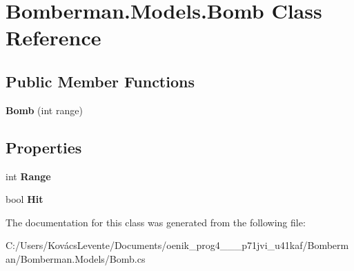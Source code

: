 \hypertarget{class_bomberman_1_1_models_1_1_bomb}{}\section{Bomberman.\+Models.\+Bomb Class Reference}
\label{class_bomberman_1_1_models_1_1_bomb}
\subsection*{Public Member Functions}
\begin{DoxyCompactItemize}
\item 
\mbox{\label{class_bomberman_1_1_models_1_1_bomb_a3503eaa73703689a2f69a60938968127}} 
{\bfseries Bomb} (int range)
\end{DoxyCompactItemize}
\subsection*{Properties}
\begin{DoxyCompactItemize}
\item 
\mbox{\label{class_bomberman_1_1_models_1_1_bomb_ab5c772b9de44d59ab18b485bb75677b7}} 
int {\bfseries Range}
\item 
\mbox{\label{class_bomberman_1_1_models_1_1_bomb_a5dcd6b6185cbbc2f4659a6d228496104}} 
bool {\bfseries Hit}
\end{DoxyCompactItemize}


The documentation for this class was generated from the following file\+:\begin{DoxyCompactItemize}
\item 
C\+:/\+Users/\+Kovács\+Levente/\+Documents/oenik\+\_\+prog4\+\_\+\_\+\_\+p71jvi\+\_\+u41kaf/\+Bomberman/\+Bomberman.\+Models/Bomb.\+cs\end{DoxyCompactItemize}
